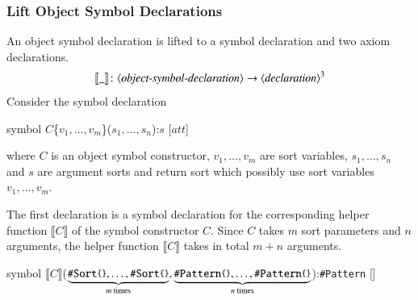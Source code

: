 \documentclass[UTF8,11pt]{article}
\theoremstyle{plain}
\theoremstyle{definition}
\theoremstyle{remark}
\newcommand{\parametric}[2]{{#1}\raisebox{.2ex}{\texttt{\footnotesize{\{}}}#2\raisebox{.2ex}{\texttt{\footnotesize{\}}}}}
\newcommand{\denote}[1]{\llbracket{#1}\rrbracket}
\newcommand{\sharpsymbol}{\#}
\newcommand{\KSort}{\texttt{\sharpsymbol Sort}}
\newcommand{\KPattern}{\texttt{\sharpsymbol Pattern}}
\newcommand{\att}{\mathit{att}}
\newcommand{\syntacc}[1]{\text{$\langle$\textit{#1}$\rangle$}}
\begin{document}
\subsubsection{Lift Object Symbol Declarations}
An object symbol declaration is lifted to a symbol declaration and two axiom
declarations.
$$ \denote{\_} \colon \syntacc{object-symbol-declaration} \to
\syntacc{declaration}^3$$
Consider the symbol declaration
\begin{center}
\ttfamily
symbol $C$\{$v_1,\dots,v_m$\}($s_1,\dots,s_n$):$s$ [$\att$]
\end{center}
where $C$ is an object symbol constructor, $v_1,\dots,v_m$ are sort variables,
$s_1,\dots,s_n$ and $s$ are argument sorts and return sort which possibly use
sort variables $v_1,\dots,v_m$.

The first declaration is a symbol declaration for the corresponding helper
function $\denote{C}$ of the symbol constructor $C$.
Since $C$ takes $m$ sort parameters and $n$ arguments, the helper function
$\denote{C}$ takes in total $m+n$ arguments.
\begin{center}
 \ttfamily
 symbol $\denote{C}$($\underbrace{\parametric{
   \KSort}{},\dots,\parametric{\KSort}{}}_\textrm{$m$
  times},\underbrace{\parametric{
   \KPattern}{},\dots,\parametric{\KPattern}{}}_\textrm{$n$
  times}$):\parametric{\KPattern}{} []
\end{center}
\end{document}
